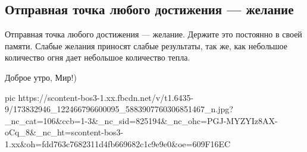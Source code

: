  
 
 
 
 
\subsection{Отправная точка любого достижения — желание}
\label{sec:15_04_2021.fb.respublikalnr.3.zhelanie}

Отправная точка любого достижения — желание. Держите это постоянно в своей
памяти. Слабые желания приносят слабые результаты, так же, как небольшое
количество огня дает небольшое количество тепла.

Доброе утро, Мир!)

\ifcmt
  pic https://scontent-bos3-1.xx.fbcdn.net/v/t1.6435-9/173832946_122466796600095_5883907760306851467_n.jpg?_nc_cat=106&ccb=1-3&_nc_sid=825194&_nc_ohc=PGJ-MYZYIz8AX-oCq_8&_nc_ht=scontent-bos3-1.xx&oh=fdd763c7682311d4fb669682c1c9e9e0&oe=609F16EC
\fi

